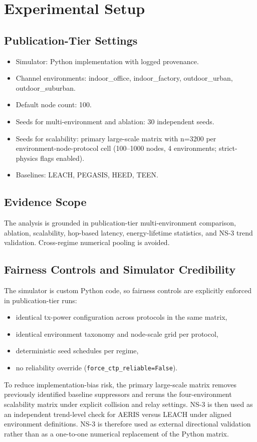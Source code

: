 ﻿\documentclass[sensors,article,submit,moreauthors,pdftex]{Definitions/mdpi}
\begin{document}
\section{Experimental Setup}
\subsection{Publication-Tier Settings}
\begin{itemize}
\item Simulator: Python implementation with logged provenance.
\item Channel environments: indoor\_office, indoor\_factory, outdoor\_urban, outdoor\_suburban.
\item Default node count: 100.
\item Seeds for multi-environment and ablation: 30 independent seeds.
\item Seeds for scalability: primary large-scale matrix with n=3200 per environment-node-protocol cell (100--1000 nodes, 4 environments; strict-physics flags enabled).
\item Baselines: LEACH, PEGASIS, HEED, TEEN.
\end{itemize}

\subsection{Evidence Scope}
The analysis is grounded in publication-tier multi-environment comparison, ablation, scalability, hop-based latency, energy-lifetime statistics, and NS-3 trend validation. Cross-regime numerical pooling is avoided.

\subsection{Fairness Controls and Simulator Credibility}
The simulator is custom Python code, so fairness controls are explicitly enforced in publication-tier runs:
\begin{itemize}
\item identical tx-power configuration across protocols in the same matrix,
\item identical environment taxonomy and node-scale grid per protocol,
\item deterministic seed schedules per regime,
\item no reliability override (\texttt{force\_ctp\_reliable=False}).
\end{itemize}

To reduce implementation-bias risk, the primary large-scale matrix removes previously identified baseline suppressors and reruns the four-environment scalability matrix under explicit collision and relay settings. NS-3 is then used as an independent trend-level check for AERIS versus LEACH under aligned environment definitions. NS-3 is therefore used as external directional validation rather than as a one-to-one numerical replacement of the Python matrix.
\end{document}
